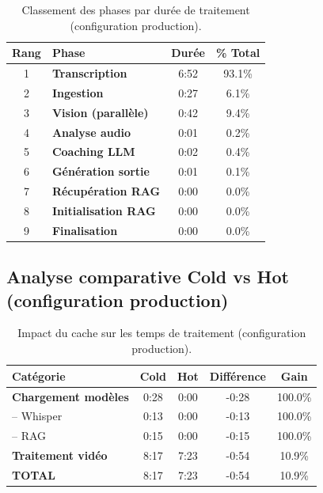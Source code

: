 ﻿\documentclass[12pt,a4paper]{article}
\begin{document}
\begin{table}[H]
    \centering
    \footnotesize
    \begin{tabularx}{\textwidth}{@{}clcc@{}}
        \toprule
        \textbf{Rang} & \textbf{Phase} & \textbf{Durée} & \textbf{\% Total} \\
        \midrule
        1 & \textbf{Transcription} & 6:52 & 93.1\% \\
        2 & \textbf{Ingestion} & 0:27 & 6.1\% \\
        3 & \textbf{Vision (parallèle)} & 0:42 & 9.4\% \\
        4 & \textbf{Analyse audio} & 0:01 & 0.2\% \\
        5 & \textbf{Coaching LLM} & 0:02 & 0.4\% \\
        6 & \textbf{Génération sortie} & 0:01 & 0.1\% \\
        7 & \textbf{Récupération RAG} & 0:00 & 0.0\% \\
        8 & \textbf{Initialisation RAG} & 0:00 & 0.0\% \\
        9 & \textbf{Finalisation} & 0:00 & 0.0\% \\
        \bottomrule
    \end{tabularx}
    \caption{Classement des phases par durée de traitement (configuration production).}
\end{table}

\subsection{Analyse comparative Cold vs Hot (configuration production)}

\begin{table}[H]
    \centering
    \footnotesize
    \begin{tabularx}{\textwidth}{@{}lcccc@{}}
        \toprule
        \textbf{Catégorie} & \textbf{Cold} & \textbf{Hot} & \textbf{Différence} & \textbf{Gain} \\
        \midrule
        \textbf{Chargement modèles} & 0:28 & 0:00 & -0:28 & 100.0\% \\
        \quad \;-- Whisper & 0:13 & 0:00 & -0:13 & 100.0\% \\
        \quad \;-- RAG & 0:15 & 0:00 & -0:15 & 100.0\% \\
        \midrule
        \textbf{Traitement vidéo} & 8:17 & 7:23 & -0:54 & 10.9\% \\
        \midrule
        \textbf{TOTAL} & 8:17 & 7:23 & -0:54 & 10.9\% \\
        \bottomrule
    \end{tabularx}
    \caption{Impact du cache sur les temps de traitement (configuration production).}
\end{table}
\end{document}

